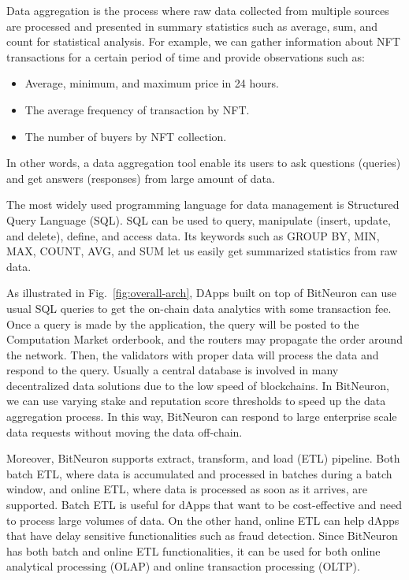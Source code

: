 \documentclass[11pt,letterpaper]{article}
\begin{document}
Data aggregation is the process where raw data collected from multiple sources are processed and presented in summary statistics such as average, sum, and count for statistical analysis. For example, we can gather information about NFT transactions for a certain period of time and provide observations such as:
\begin{itemize}
    \item Average, minimum, and maximum price in 24 hours.
    \item The average frequency of transaction by NFT.
    \item The number of buyers by NFT collection.
\end{itemize}
In other words, a data aggregation tool enable its users to ask questions (queries) and get answers (responses) from large amount of data. 

The most widely used programming language for data management is Structured Query Language (SQL). SQL can be used to query, manipulate (insert, update, and delete), define, and access data. Its keywords such as GROUP BY, MIN, MAX, COUNT, AVG, and SUM let us easily get summarized statistics from raw data.

As illustrated in Fig.~\ref{fig:overall-arch}, DApps built on top of BitNeuron can use usual SQL queries to get the on-chain data analytics with some transaction fee. Once a query is made by the application, the query will be posted to the Computation Market orderbook, and the routers may propagate the order around the network. Then, the validators with proper data will process the data and respond to the query. Usually a central database is involved in many decentralized data solutions due to the low speed of blockchains. In BitNeuron, we can use varying stake and reputation score thresholds to speed up the data aggregation process. In this way, BitNeuron can respond to large enterprise scale data requests without moving the data off-chain.

Moreover, BitNeuron supports extract, transform, and load (ETL) pipeline.  Both batch ETL, where data is accumulated and processed in batches during a batch window, and online ETL, where data is processed as soon as it arrives, are supported. Batch ETL is useful for dApps that want to be cost-effective and need to process large volumes of data. On the other hand, online ETL can help dApps that have delay sensitive functionalities such as fraud detection. Since BitNeuron has both batch and online ETL functionalities, it can be used for both online analytical processing (OLAP) and online transaction processing (OLTP).
\end{document}
